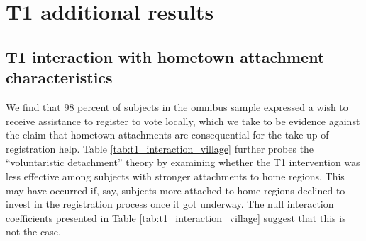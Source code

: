 \documentclass[
  11.5pt,
]{article}
\begin{document}
\clearpage

\hypertarget{t1-additional-results}{%
\section{T1 additional results}\label{t1-additional-results}}

\hypertarget{t1-interaction-with-hometown-attachment-characteristics}{%
\subsection{T1 interaction with hometown attachment
characteristics}\label{t1-interaction-with-hometown-attachment-characteristics}}

We find that 98 percent of subjects in the omnibus sample expressed a
wish to receive assistance to register to vote locally, which we take to
be evidence against the claim that hometown attachments are
consequential for the take up of registration help. Table
\ref{tab:t1_interaction_village} further probes the ``voluntaristic
detachment'' theory by examining whether the T1 intervention was less
effective among subjects with stronger attachments to home regions. This
may have occurred if, say, subjects more attached to home regions
declined to invest in the registration process once it got underway. The
null interaction coefficients presented in Table
\ref{tab:t1_interaction_village} suggest that this is not the case.
\end{document}
